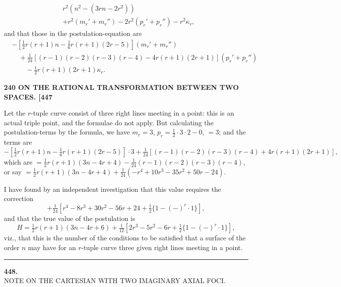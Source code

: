 \documentclass[11pt]{article}
\begin{document}
\begin{align*}
& r^2(n^2 - (3rn - 2r^2))\\
& + r^2(m_r' + m_r'') - 2r^2(p_r' + p_r'') - r^2\kappa_r,
\end{align*}
and that those in the postulation-equation are
\begin{align*}
& - [\tfrac{1}{2} r(r+1)n - \tfrac{1}{6} r(r+1)(2r-5)](m_r' + m_r'')\\
& \quad + \tfrac{1}{24}[(r-1)(r-2)(r-3)(r-4) - 4r(r+1)(2r+1)](p_r' + p_r'')\\
& \quad\quad - \tfrac{1}{2} r(r+1)(2r+1)\kappa_r.
\end{align*}

\medskip
\noindent\textbf{240 \hfill ON THE RATIONAL TRANSFORMATION BETWEEN TWO SPACES. \hfill [447}

\medskip

Let the $r$-tuple curve consist of three right lines meeting in a point: this is an
actual triple point, and the formulae do not apply. But calculating the postulation-terms
by the formula, we have $m_r = 3$, $p_r = \tfrac{1}{2}\cdot 3\cdot 2 - 0$, $=3$; and the terms are
\[ -[\tfrac{1}{2} r(r+1)n - \tfrac{1}{6} r(r+1)(2r-5)]\cdot 3 + \tfrac{1}{24}[(r-1)(r-2)(r-3)(r-4) + 4r(r+1)(2r+1)], \]
which are $= \tfrac{1}{2} r(r+1)(3n - 4r + 4) - \tfrac{1}{24}(r-1)(r-2)(r-3)(r-4)$,
or say $= \tfrac{1}{2} r(r+1)(3n - 4r + 4) + \tfrac{1}{24}(-r^4 + 10r^3 - 35r^2 + 50r - 24)$.

I have found by an independent investigation that this value requires the correction
\[ + \tfrac{1}{24}[r^4 - 8r^3 + 30r^2 - 56r + 24 + \tfrac{1}{2}\{1 - (-)^r\cdot 1\}], \]
and that the true value of the postulation is
\[ H = \tfrac{1}{2} r(r+1)(3n - 4r + 6) + \tfrac{1}{12}[2r^3 - 5r^2 - 6r + \tfrac{1}{2}\{1 - (-)^r\cdot 1\}], \]
viz., that this is the number of the conditions to be satisfied that a surface of the
order $n$ may have for an $r$-tuple curve three given right lines meeting in a point.

\bigskip
\hrule
\bigskip

\begin{center}
{\large\bfseries 448.}\\[6pt]
{\large NOTE ON THE CARTESIAN WITH TWO IMAGINARY AXIAL FOCI.}
\end{center}

\medskip

\end{document}
